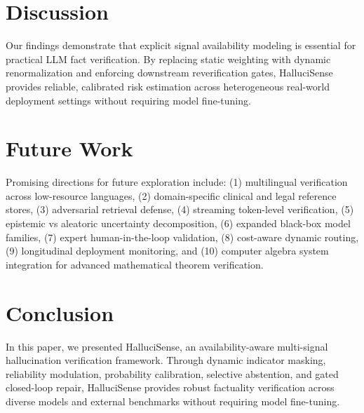\documentclass[11pt,a4paper]{article}
\begin{document}
\section{Discussion}
\label{sec:discussion}
Our findings demonstrate that explicit signal availability modeling is essential for practical LLM fact verification. By replacing static weighting with dynamic renormalization and enforcing downstream reverification gates, HalluciSense provides reliable, calibrated risk estimation across heterogeneous real-world deployment settings without requiring model fine-tuning.

\section{Future Work}
\label{sec:future_work}
Promising directions for future exploration include: (1) multilingual verification across low-resource languages, (2) domain-specific clinical and legal reference stores, (3) adversarial retrieval defense, (4) streaming token-level verification, (5) epistemic vs aleatoric uncertainty decomposition, (6) expanded black-box model families, (7) expert human-in-the-loop validation, (8) cost-aware dynamic routing, (9) longitudinal deployment monitoring, and (10) computer algebra system integration for advanced mathematical theorem verification.

\section{Conclusion}
\label{sec:conclusion}
In this paper, we presented HalluciSense, an availability-aware multi-signal hallucination verification framework. Through dynamic indicator masking, reliability modulation, probability calibration, selective abstention, and gated closed-loop repair, HalluciSense provides robust factuality verification across diverse models and external benchmarks without requiring model fine-tuning.



\end{document}
